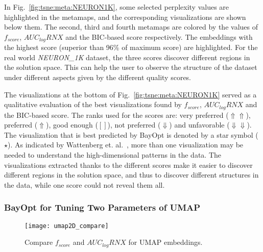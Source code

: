In Fig.~\ref{fig:tsne:meta:NEURON1K}, some selected perplexity values are highlighted in the metamaps, and the corresponding visualizations are shown below them.
The second, third and fourth metamaps are colored by the values of $f_{score}$, $AUC_{log}RNX$ and the BIC-based score respectively.
The embeddings with the highest score (superior than 96\% of maximum score) are highlighted.
For the real world \emph{NEURON\_1K} dataset, the three scores discover different regions in the solution space. This can help the user to observe the structure of the dataset under different aspects given by the different quality scores.

The visualizations at the bottom of Fig.~\ref{fig:tsne:meta:NEURON1K} served as a qualitative evaluation of the best visualizations found by $f_{score}$, $AUC_{log}RNX$ and the BIC-based score.
The ranks used for the scores are: very preferred ($\Uparrow\Uparrow$), preferred ($\Uparrow$), good enough ($[]$), not preferred ($\Downarrow$) and unfavorable ($\Downarrow\Downarrow$).
The visualization that is best predicted by BayOpt is denoted by a star symbol ($\star$).
As indicated by Wattenberg et. al.~\cite{wattenberg2016use}, more than one visualization may be needed to understand the high-dimensional patterns in the data.
The visualizations extracted thanks to the different scores make it easier to discover different regions in the solution space, and thus to discover different structures in the data, while one score could not reveal them all.


\subsubsection{BayOpt for Tuning Two Parameters of UMAP}\label{sec:result:bo:umap}

\begin{figure}
    \centering
    \texttt{[image: umap2D\_compare]}
    \caption{Compare $f_{score}$ and $AUC_{log}RNX$ for UMAP embeddings.}
    \label{fig:score:umap2D:compare}
\end{figure}

